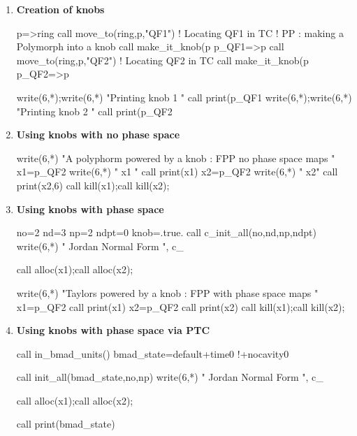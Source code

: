 \documentclass{hitec}     %
\begin{document}
{{{{{{ 
 
 \begin{enumerate}
 \item\label{itc1} {\bf Creation of knobs}
 
  \begin{code}
p=>ring%
call move_to(ring,p,"QF1")   !  Locating QF1 in TC
!  PP : making a Polymorph into a knob
call make_it_knob(p%
p_QF1=>p
call move_to(ring,p,"QF2")   ! Locating QF2 in TC
call make_it_knob(p%
p_QF2=>p

write(6,*);write(6,*) "Printing knob 1  "
call print(p_QF1%
write(6,*);write(6,*) "Printing knob 2  "
call print(p_QF2%
  \end{code}
  
 \item\label{itc2} {\bf Using knobs with no phase space}
 
  \begin{code}
write(6,*) "A polyphorm powered by a knob : FPP no phase space maps "
x1=p_QF2%
write(6,*) " x1 "
call print(x1)
x2=p_QF2%
write(6,*) " x2"
call print(x2,6)
call kill(x1);call kill(x2);
  \end{code}
  
 \item\label{itc3} {\bf Using knobs with phase space}
 
  \begin{code}

no=2
nd=3
np=2
ndpt=0
knob=.true. 
call c_init_all(no,nd,np,ndpt)
write(6,*) " Jordan Normal Form ", c_%

call alloc(x1);call alloc(x2);

 

write(6,*) "Taylors powered by a knob : FPP with phase space maps "
x1=p_QF2%
call print(x1)
x2=p_QF2%
call print(x2)
call kill(x1);call kill(x2);
  \end{code}
  
 \item\label{itc4} {\bf Using knobs with phase space via PTC}
 
  \begin{code}
call in_bmad_units()
bmad_state=default+time0      !+nocavity0

call init_all(bmad_state,no,np)
write(6,*) " Jordan Normal Form ", c_%


call alloc(x1);call alloc(x2);

call print(bmad_state)
 


\end{code}
\end{enumerate}}}}}}}
\end{document}
